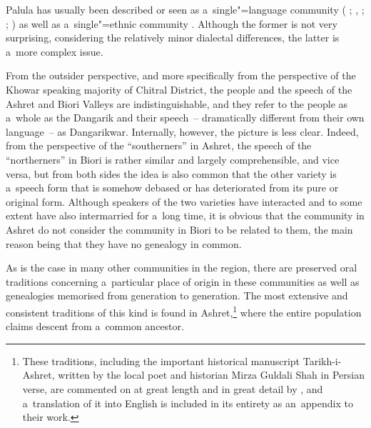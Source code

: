 Palula has usually been described or seen as a~single"=language community (\citealt[7]{morgenstierne1941} ; \citealt[67]{decker1992a}, \citeyear[160]{decker1996} ; \citealt[21]{masica1991}; \citealt[253, 258]{strand2001}) as well as a~single"=ethnic community \citep[79--143]{cacopardo2001}. Although the former is not very surprising, considering the relatively minor dialectal differences, the latter is a~more complex issue.


From the outsider perspective, and more specifically from the perspective of the Khowar speaking majority of Chitral District, the people and the speech of the Ashret and Biori Valleys are indistinguishable, and they refer to the people as a~whole as the Dangarik and their speech~-- dramatically different from their own language~-- as Dangarikwar. Internally, however, the picture is less clear. Indeed, from the perspective of the ``southerners'' in Ashret, the speech of the ``northerners'' in Biori is rather similar and largely comprehensible, and vice versa, but from both sides the idea is also common that the other variety is a~speech form that is somehow debased or has deteriorated from its pure or original form. Although speakers of the two varieties have interacted and to some extent have also intermarried for a~long time, it is obvious that the community in Ashret do not consider the community in Biori to be related to them, the main reason being that they have no genealogy in common. 


As is the case in many other communities in the region, there are preserved oral traditions concerning a~particular place of origin in these communities as well as genealogies memorised from generation to generation. The most extensive and consistent traditions of this kind is found in Ashret,\footnote{These traditions, including the important historical manuscript Tarikh-i-Ashret, written by the local poet and historian Mirza Guldali Shah in Persian verse, are commented on at great length and in great detail by \citet[79--143]{cacopardo2001}, and a~translation of it into English is included in its entirety as an~appendix to their work.} where the entire population claims descent from a~common ancestor. 


